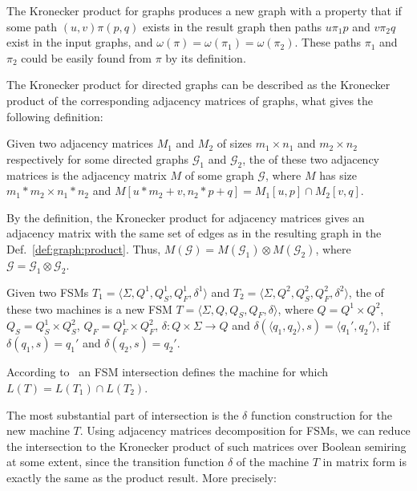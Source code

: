 The Kronecker product for graphs produces a new graph with a property
that if some path $(u,v)\pi(p,q)$ exists in the result graph
then paths $u\pi_1p$ and $v\pi_2q$ exist in the input graphs,
and $\omega(\pi) = \omega(\pi_1) = \omega(\pi_2)$.
These paths $\pi_1$ and $\pi_2$ could be easily found from $\pi$ by its definition.

The Kronecker product for directed graphs can be described as
the Kronecker product of the corresponding adjacency matrices of graphs,
what gives the following definition:

\begin{definition}
Given two adjacency matrices $M_1$ and $M_2$ of sizes
$m_1 \times n_1$ and $m_2 \times n_2$ respectively
for some directed graphs $\mathcal{G}_1$ and $\mathcal{G}_2$,
the  of these two adjacency matrices is the adjacency matrix $M$
of some graph $\mathcal{G}$, where $M$ has size $m_1 * m_2 \times n_1 * n_2$ and $M[u * m_2 + v,n_2 * p + q] = M_1[u,p] \cap M_2[v,q]$.
\end{definition}

By the definition, the Kronecker product for adjacency matrices gives an
adjacency matrix with the same set of edges as in the resulting graph in the
Def.~\ref{def:graph:product}. Thus, $M(\mathcal{G}) = M(\mathcal{G}_1) \otimes
M(\mathcal{G}_2)$, where $\mathcal{G} = \mathcal{G}_1 \otimes \mathcal{G}_2$.

\begin{definition}
\label{def:fsm:intersection}
Given two FSMs $T_1 = \langle \Sigma, Q^1, Q_S^1, Q_F^1, \delta^1 \rangle$
and $T_2 = \langle \Sigma, Q^2, Q_S^2, Q_F^2, \delta^2 \rangle$, the  of these two machines is a new FSM
$T = \langle \Sigma, Q, Q_S, Q_F, \delta \rangle$, where $Q = Q^1 \times Q^2$, $Q_S = Q_S^1 \times Q_S^2$, $Q_F = Q_F^1 \times Q_F^2$, $\delta: Q \times \Sigma \to Q$ and $\delta (\langle q_1, q_2 \rangle, s) = \langle q_1', q_2' \rangle$, if $\delta(q_1,s)=q_1'$ and $\delta(q_2,s)=q_2'$.
\end{definition}

According to~\cite{automata:theory:10.5555/1177300} an FSM intersection defines the machine for which $L(T) = L(T_1) \cap L(T_2)$.

The most substantial part of intersection is the $\delta$ function construction for the new machine $T$.
Using adjacency matrices decomposition for FSMs, we can reduce the intersection to the Kronecker product of such matrices over Boolean semiring at some extent, since the transition function $\delta$ of the machine $T$ in matrix form is exactly the same as the product result.
More precisely:

